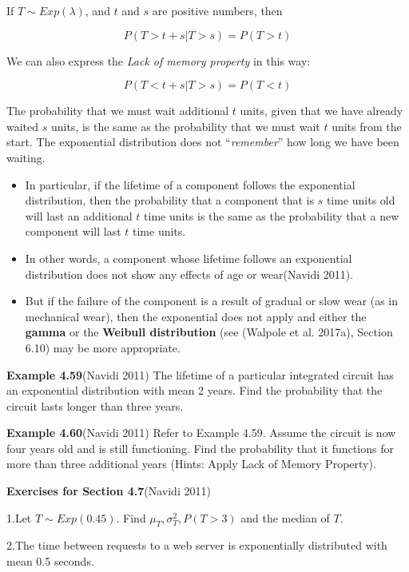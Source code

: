\documentclass[
  11pt,
  letterpaper,
  DIV=11,
  numbers=noendperiod]{scrreprt}
\begin{document}
If \(T \sim Exp(\lambda)\), and \(t\) and \(s\) are positive numbers,
then

\[P(T> t+s| T> s)=P(T> t)\]

We can also express the \emph{Lack of memory property} in this way:

\[P(T< t+s| T> s)=P(T< t)\]

The probability that we must wait additional \(t\) units, given that we
have already waited \(s\) units, is the same as the probability that we
must wait \(t\) units from the start. The exponential distribution does
not ``\emph{remember}'' how long we have been waiting.

\begin{itemize}
\item
  In particular, if the lifetime of a component follows the exponential
  distribution, then the probability that a component that is \(s\) time
  units old will last an additional \(t\) time units is the same as the
  probability that a new component will last \(t\) time units.
\item
  In other words, a component whose lifetime follows an exponential
  distribution does not show any effects of age or wear(Navidi 2011).
\item
  But if the failure of the component is a result of gradual or slow
  wear (as in mechanical wear), then the exponential does not apply and
  either the \textbf{gamma} or the \textbf{Weibull distribution} (see
  (Walpole et al. 2017a), Section 6.10) may be more appropriate.
\end{itemize}

\textbf{Example 4.59}(Navidi 2011) The lifetime of a particular
integrated circuit has an exponential distribution with mean 2 years.
Find the probability that the circuit lasts longer than three years.

\textbf{Example 4.60}(Navidi 2011) Refer to Example 4.59. Assume the
circuit is now four years old and is still functioning. Find the
probability that it functions for more than three additional years
(Hints: Apply Lack of Memory Property).

\textbf{Exercises for Section 4.7}(Navidi 2011)

1.Let \(T \sim Exp(0.45)\). Find \(\mu_T, \sigma^2_T, P(T>3)\) and the
median of \(T\).

2.The time between requests to a web server is exponentially distributed
with mean 0.5 seconds.
\end{document}
